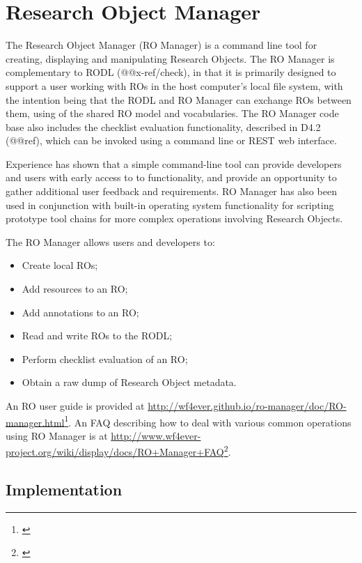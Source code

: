 \section{Research Object Manager}
\label{sec:romanager}


The Research Object Manager (RO Manager) is a command line tool for creating, displaying and manipulating Research Objects. The RO Manager is complementary to RODL (@@x-ref/check), in that it is primarily designed to support a user working with ROs in the host computer's local file system, with the intention being that the RODL and RO Manager can exchange ROs between them, using of the shared RO model and vocabularies.  The RO Manager code base also includes the checklist evaluation functionality, described in D4.2 (@@ref), which can be invoked using a command line or REST web interface.

Experience has shown that a simple command-line tool can provide developers and users with early access to to functionality, and provide an opportunity to gather additional user feedback and requirements.  RO Manager has also been used in conjunction with built-in operating system functionality for scripting prototype tool chains for more complex operations involving Research Objects.

The RO Manager allows users and developers to:

\begin{itemize}

\item Create local ROs;
\item Add resources to an RO;
\item Add annotations to an RO;
\item Read and write ROs to the RODL;
\item Perform checklist evaluation of an RO;
\item Obtain a raw dump of Research Object metadata.
\end{itemize}

An RO user guide is provided at \href{}{http://wf4ever.github.io/ro-manager/doc/RO-manager.html}\footnote{\href{}{}}.  An FAQ describing how to deal with various common operations using RO Manager is at \href{}{http://www.wf4ever-project.org/wiki/display/docs/RO+Manager+FAQ}\footnote{\href{}{}}.

\subsection{Implementation}
\label{implementation}

